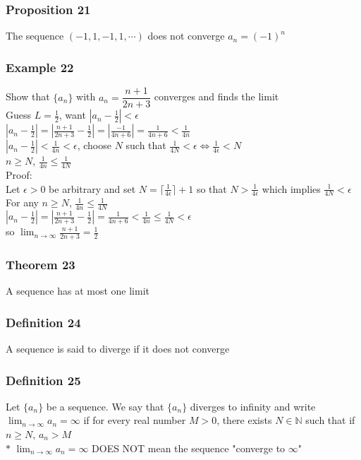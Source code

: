 \documentclass[12pt, letterpaper]{article}
\begin{document}
\subsubsection*{Proposition 21}
The sequence $(-1, 1, -1, 1, \cdots)$ does not converge $a_n = (-1)^n$
\subsubsection*{Example 22}
Show that $\{a_n\}$ with $a_n = \dfrac{n+1}{2n+3}$ converges and finds the limit \\
Guess $L = \frac{1}{2}$, want $|a_n - \frac{1}{2}| < \epsilon$ \\
$|a_n - \frac{1}{2}| = |\frac{n+1}{2n+3} - \frac{1}{2}| = |\frac{-1}{4n+6}| = \frac{1}{4n+6} < \frac{1}{4n}$ \\
$|a_n - \frac{1}{2}| < \frac{1}{4n} < \epsilon$, choose $N$ such that $\frac{1}{4N} < \epsilon \iff \frac{1}{4\epsilon} < N$ \\
$n \geq N$, $\frac{1}{4n} \leq \frac{1}{4N}$ \\
Proof: \\
Let $\epsilon > 0$ be arbitrary and set $N = \lceil\frac{1}{4\epsilon}\rceil + 1$ so that $N > \frac{1}{4\epsilon}$ 
which implies $\frac{1}{4N} < \epsilon$ \\
For any $n \geq N$, $\frac{1}{4n} \leq \frac{1}{4N}$ \\
$|a_n - \frac{1}{2}| = |\frac{n+1}{2n+3} - \frac{1}{2}| = \frac{1}{4n+6} < \frac{1}{4n} \leq \frac{1}{4N} < \epsilon$ \\
so $\displaystyle\lim_{n\to\infty} \frac{n+1}{2n+3} = \frac{1}{2}$
\subsubsection*{Theorem 23}
A sequence has at most one limit
\subsubsection*{Definition 24}
A sequence is said to diverge if it does not converge 
\subsubsection*{Definition 25}
Let $\{a_n\}$ be a sequence. We say that $\{a_n\}$ diverges to infinity and write 
$\displaystyle\lim_{n\to\infty} a_n = \infty$ if for every real number $M > 0$, there 
exists $N \in \mathbb{N}$ such that if $n\geq N$, $a_n > M$ \\
$\ast$ $\displaystyle\lim_{n\to\infty} a_n = \infty$ DOES NOT mean the sequence "converge to $\infty$"
\end{document}
